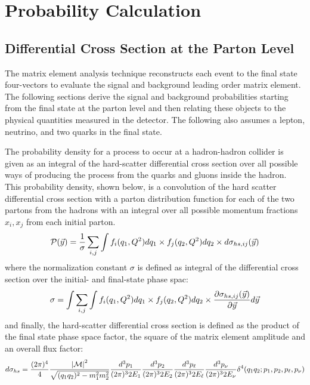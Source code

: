 \section{Probability Calculation}
\label{full}

\subsection{Differential Cross Section at the Parton Level}

The matrix element analysis technique reconstructs each event to the
final state four-vectors to evaluate the signal and background leading
order matrix element. The following sections derive the signal and
background probabilities starting from the final state at the parton
level and then relating these objects to the physical quantities
measured in the detector. The following also assumes a lepton,
neutrino, and two quarks in the final state.

The probability density for a process to occur at a hadron-hadron
collider is given as an integral of the hard-scatter differential
cross section over all possible ways of producing the process from the
quarks and gluons inside the hadron. This probability density, shown
below, is a convolution of the hard scatter differential cross section
with a parton distribution function for each of the two partons from
the hadrons with an integral over all possible momentum fractions
$x_{i}, x_{j}$ from each initial parton.
\begin{equation}
{\cal P}(\vec{y}) = \frac{1}{\sigma} \sum_{i,j}
\int f_{i}(q_{1}, Q^{2})dq_{1}
\times f_{j}(q_{2}, Q^{2})dq_{2}
\times d\sigma_{hs,ij}(\vec{y})
\end{equation}
\noindent where the normalization constant $\sigma$ is defined as
integral of the differential cross section over the initial- and
final-state phase spac:
\begin{equation}
\label{ds}
\sigma = \int  \sum_{i,j}
\int f_{i}(q_{1}, Q^{2})dq_{1}
\times f_{j}(q_{2}, Q^{2})dq_{2}
\times \frac{\partial \sigma_{hs,ij}(\vec{y})}{\partial \vec{y}} d\vec{y}
\end{equation}
\noindent and finally, the hard-scatter differential cross section is
defined as the product of the final state phase space factor, the
square of the matrix element amplitude and an overall flux factor:
\begin{equation}
d\sigma_{hs} = \frac{(2\pi)^4}{4}
\frac{{|\cal M|}^{2}}
{\sqrt{(q_{1}q_{2})^2 - m_{1}^2 m_{2}^2}}
\frac{d^{3}p_{1}}{(2\pi)^3 2E_{1}}
\frac{d^{3}p_{2}}{(2\pi)^3 2E_{2}}
\frac{d^{3}p_{\ell}}{(2\pi)^3 2E_{\ell}}
\frac{d^{3}p_{\nu}}{(2\pi)^3 2E_{\nu}}
\delta^{4}(q_{1}q_{2};p_{1},p_{2},p_{\ell},p_{\nu})
\end{equation}


